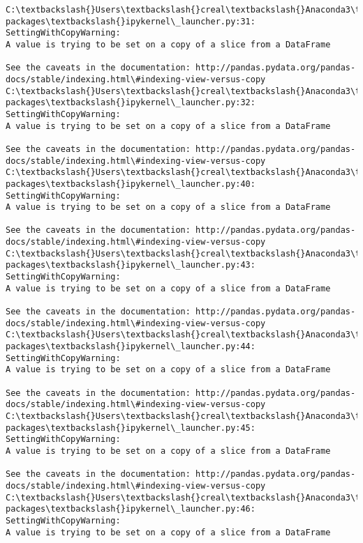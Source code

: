 \documentclass[11pt]{article}
\begin{document}
    \begin{Verbatim}[commandchars=\\\{\}]
C:\textbackslash{}Users\textbackslash{}creal\textbackslash{}Anaconda3\textbackslash{}lib\textbackslash{}site-packages\textbackslash{}ipykernel\_launcher.py:31: SettingWithCopyWarning: 
A value is trying to be set on a copy of a slice from a DataFrame

See the caveats in the documentation: http://pandas.pydata.org/pandas-docs/stable/indexing.html\#indexing-view-versus-copy
C:\textbackslash{}Users\textbackslash{}creal\textbackslash{}Anaconda3\textbackslash{}lib\textbackslash{}site-packages\textbackslash{}ipykernel\_launcher.py:32: SettingWithCopyWarning: 
A value is trying to be set on a copy of a slice from a DataFrame

See the caveats in the documentation: http://pandas.pydata.org/pandas-docs/stable/indexing.html\#indexing-view-versus-copy
C:\textbackslash{}Users\textbackslash{}creal\textbackslash{}Anaconda3\textbackslash{}lib\textbackslash{}site-packages\textbackslash{}ipykernel\_launcher.py:40: SettingWithCopyWarning: 
A value is trying to be set on a copy of a slice from a DataFrame

See the caveats in the documentation: http://pandas.pydata.org/pandas-docs/stable/indexing.html\#indexing-view-versus-copy
C:\textbackslash{}Users\textbackslash{}creal\textbackslash{}Anaconda3\textbackslash{}lib\textbackslash{}site-packages\textbackslash{}ipykernel\_launcher.py:43: SettingWithCopyWarning: 
A value is trying to be set on a copy of a slice from a DataFrame

See the caveats in the documentation: http://pandas.pydata.org/pandas-docs/stable/indexing.html\#indexing-view-versus-copy
C:\textbackslash{}Users\textbackslash{}creal\textbackslash{}Anaconda3\textbackslash{}lib\textbackslash{}site-packages\textbackslash{}ipykernel\_launcher.py:44: SettingWithCopyWarning: 
A value is trying to be set on a copy of a slice from a DataFrame

See the caveats in the documentation: http://pandas.pydata.org/pandas-docs/stable/indexing.html\#indexing-view-versus-copy
C:\textbackslash{}Users\textbackslash{}creal\textbackslash{}Anaconda3\textbackslash{}lib\textbackslash{}site-packages\textbackslash{}ipykernel\_launcher.py:45: SettingWithCopyWarning: 
A value is trying to be set on a copy of a slice from a DataFrame

See the caveats in the documentation: http://pandas.pydata.org/pandas-docs/stable/indexing.html\#indexing-view-versus-copy
C:\textbackslash{}Users\textbackslash{}creal\textbackslash{}Anaconda3\textbackslash{}lib\textbackslash{}site-packages\textbackslash{}ipykernel\_launcher.py:46: SettingWithCopyWarning: 
A value is trying to be set on a copy of a slice from a DataFrame


\end{Verbatim}
\end{document}
